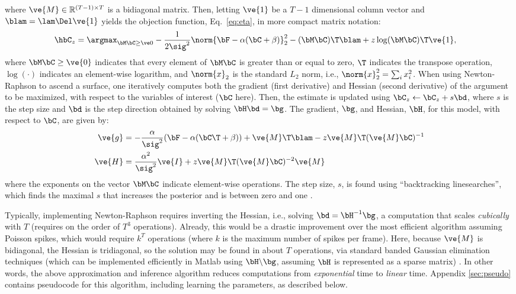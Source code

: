 \noindent where $\ve{M} \in \mathbb{R}^{(T-1) \times T}$ is a bidiagonal matrix.  Then, letting $\ve{1}$ be a $T-1$ dimensional column vector and $\blam=\lam \Del \ve{1}$ yields the objection function, Eq.~\eqref{eq:eta}, in more compact matrix notation:
\begin{align} 
\hbC_{\zzz} 
&= \az  -\frac{1}{2 \sig^2} \norm{\bF - \alpha (\bC +\beta)}_2^2 - (\bM \bC )\T \blam  + \zzz \log(\bM \bC)\T\ve{1},  \label{eq:eta3}
\end{align}
\noindent where $\bM \bC \geq \ve{0}$ indicates that every element of $\bM \bC$ is greater than or equal to zero, $\T$ indicates the transpose operation, $\log(\cdot)$ indicates an element-wise logarithm, and $\norm{x}_2$ is the standard $L_2$ norm, i.e., $\norm{x}_2^2=\sum_i x_i^2$. When using Newton-Raphson to ascend a surface, one iteratively computes both the gradient (first derivative) and Hessian (second derivative) of the argument to be maximized, with respect to the variables of interest ($\bC$ here).  Then, the estimate is updated using $\bC_z \leftarrow \bC_z + s \bd$, where $s$ is the step size and $\bd$ is the step direction obtained by solving $\bH \bd = \bg$.  The gradient, $\bg$, and Hessian, $\bH$, for this model, with respect to $\bC$, are given by:
\begin{subequations} \label{eq:NR}
\begin{align}
\ve{g} &= -\frac{\alpha}{\sig^2}(\bF -\alpha({\bC\T} + \beta)) + \ve{M}\T\blam - \zzz \ve{M}\T (\ve{M} \bC)^{-1} \label{eq:g} \\
\ve{H} &= \frac{\alpha^2}{\sig^2} \ve{I} + \zzz \ve{M}\T (\ve{M} \bC)^{-2} \ve{M} \label{eq:H}
\end{align}
\end{subequations}
\noindent where the exponents on the vector $\bM \bC$ indicate element-wise operations. The step size, $s$, is found using ``backtracking linesearches'', which finds the maximal $s$ that increases the posterior and is between zero and one \cite{Press92}.

Typically, implementing Newton-Raphson requires inverting the Hessian, i.e.,  solving $\bd = \bH^{-1} \bg$, a computation that scales \emph{cubically} with $T$ (requires on the order of $T^3$ operations). Already, this would be a drastic improvement over the most efficient algorithm assuming Poisson spikes, which would require $k^T$ operations (where $k$ is the maximum number of spikes per frame).  Here, because $\ve{M}$ is bidiagonal, the Hessian is tridiagonal, so the solution may be found in about $T$ operations, via standard banded Gaussian elimination techniques (which can be implemented efficiently in Matlab using $\bH \backslash \bg$, assuming $\bH$ is represented as a sparse matrix) \cite{PaninskiWu09}. In other words, the above approximation and inference algorithm reduces computations from \emph{exponential} time to \emph{linear} time.  Appendix \ref{sec:pseudo} contains pseudocode for this algorithm, including learning the parameters, as described below.





